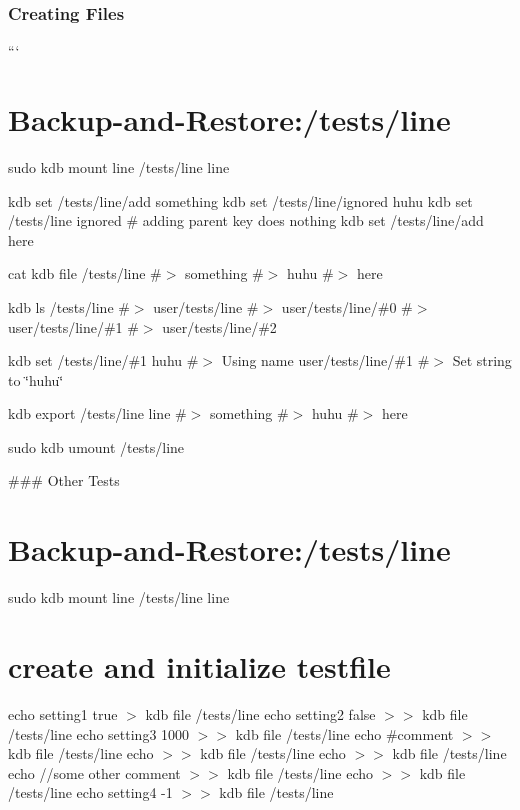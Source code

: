 \subsubsection*{Creating Files}

``` \section*{Backup-\/and-\/\+Restore\+:/tests/line}

sudo kdb mount line /tests/line line

kdb set /tests/line/add something kdb set /tests/line/ignored huhu kdb set /tests/line ignored \# adding parent key does nothing kdb set /tests/line/add here

cat {\ttfamily kdb file /tests/line} \#$>$ something \#$>$ huhu \#$>$ here

kdb ls /tests/line \#$>$ user/tests/line \#$>$ user/tests/line/\#0 \#$>$ user/tests/line/\#1 \#$>$ user/tests/line/\#2

kdb set /tests/line/\#1 huhu \#$>$ Using name user/tests/line/\#1 \#$>$ Set string to \char`\"{}huhu\char`\"{}

kdb export /tests/line line \#$>$ something \#$>$ huhu \#$>$ here

sudo kdb umount /tests/line 
\begin{DoxyCode}
### Other Tests
\end{DoxyCode}
 \section*{Backup-\/and-\/\+Restore\+:/tests/line}

sudo kdb mount line /tests/line line

\section*{create and initialize testfile}

echo \textquotesingle{}setting1 true\textquotesingle{} $>$ {\ttfamily kdb file /tests/line} echo \textquotesingle{}setting2 false\textquotesingle{} $>$$>$ {\ttfamily kdb file /tests/line} echo \textquotesingle{}setting3 1000\textquotesingle{} $>$$>$ {\ttfamily kdb file /tests/line} echo \textquotesingle{}\#comment\textquotesingle{} $>$$>$ {\ttfamily kdb file /tests/line} echo $>$$>$ {\ttfamily kdb file /tests/line} echo $>$$>$ {\ttfamily kdb file /tests/line} echo \textquotesingle{}//some other comment\textquotesingle{} $>$$>$ {\ttfamily kdb file /tests/line} echo $>$$>$ {\ttfamily kdb file /tests/line} echo \textquotesingle{}setting4 -\/1\textquotesingle{} $>$$>$ {\ttfamily kdb file /tests/line}

